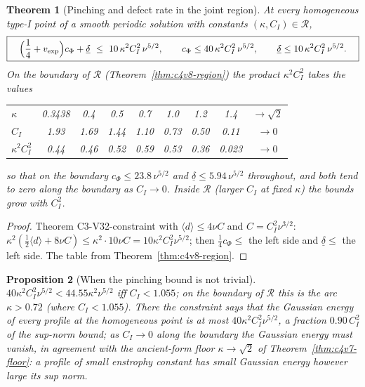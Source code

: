 \documentclass[11pt]{article}
\theoremstyle{plain}
\newtheorem{theorem}{Theorem}[section]
\newtheorem{proposition}[theorem]{Proposition}
\theoremstyle{definition}
\theoremstyle{remark}
\begin{document}
\begin{theorem}[Pinching and defect rate in the joint region]
\label{thm:c4v11-constraint}
At every homogeneous type-I point of a smooth periodic solution
with constants \((\kappa,C_I)\in\mathcal R\),
\begin{equation}
 \boxed{\quad
 \Bigl(\frac14+v_{\rm exp}\Bigr)c_\Phi+\underline\delta\ \le\ 10\,\kappa^2C_I^2\,\nu^{5/2},\qquad
 c_\Phi\le40\,\kappa^2C_I^2\,\nu^{5/2},\qquad \underline\delta\le10\,\kappa^2C_I^2\,\nu^{5/2} .
 \quad}
 \label{eq:c4v11-constraint}
\end{equation}
On the boundary of \(\mathcal R\) (Theorem~\ref{thm:c4v8-region}) the product \(\kappa^2C_I^2\)
takes the values
\medskip
\begin{center}\small
\begin{tabular}{@{}lcccccccc@{}}
\toprule
\(\kappa\) & 0.3438 & 0.4 & 0.5 & 0.7 & 1.0 & 1.2 & 1.4 & \(\to\sqrt2\)\\
\(C_I\) & 1.93 & 1.69 & 1.44 & 1.10 & 0.73 & 0.50 & 0.11 & \(\to0\)\\
\(\kappa^2C_I^2\) & 0.44 & 0.46 & 0.52 & 0.59 & 0.53 & 0.36 & 0.023 & \(\to0\)\\
\bottomrule
\end{tabular}
\end{center}
\medskip
so that on the boundary \(c_\Phi\le23.8\,\nu^{5/2}\) and \(\underline\delta\le5.94\,\nu^{5/2}\) throughout, and both
tend to zero along the boundary as \(C_I\to0\).  Inside \(\mathcal R\) (larger \(C_I\) at
fixed \(\kappa\)) the bounds grow with \(C_I^2\).
\end{theorem}

\begin{proof}
Theorem C3-V32-constraint with \(\langle d\rangle\le4\nu C\) and \(C=C_I^2\nu^{3/2}\):
\(\kappa^2(\frac12\langle d\rangle+8\nu C)\le\kappa^2\cdot10\nu C=10\kappa^2C_I^2\nu^{5/2}\); then \(\frac14c_\Phi\le\) the left side
and \(\underline\delta\le\) the left side.  The table from Theorem~\ref{thm:c4v8-region}.
\end{proof}

\begin{proposition}[When the pinching bound is not trivial]
\label{prop:c4v11-pinching}
\(40\kappa^2C_I^2\nu^{5/2}<44.55\kappa^2\nu^{5/2}\) iff \(C_I<1.055\); on the boundary of \(\mathcal R\) this is
the arc \(\kappa>0.72\) (where \(C_I<1.055\)).  There the constraint says that
the Gaussian energy of every profile at the homogeneous point is
at most \(40\kappa^2C_I^2\nu^{5/2}\), a fraction \(0.90\,C_I^2\) of the sup-norm bound; as
\(C_I\to0\) along the boundary the Gaussian energy must vanish, in
agreement with the ancient-form floor \(\kappa\to\sqrt2\) of
Theorem~\ref{thm:c4v7-floor}: a profile of small enstrophy constant has
small Gaussian energy however large its sup norm.
\end{proposition}
\end{document}
